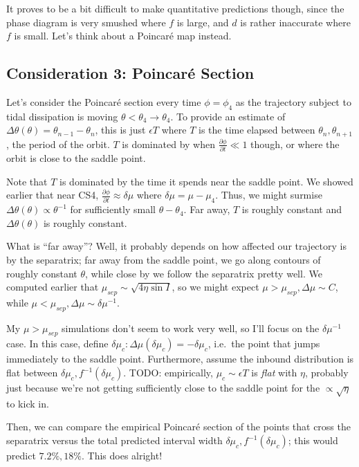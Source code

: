 \documentclass[11pt,
        usenames, %
        dvipsnames %
    ]{article}
\newcommand*{\pd}[2]{\frac{\partial#1}{\partial#2}}
\newcommand*{\p}[1]{\left(#1\right)}
\begin{document}
It proves to be a bit difficult to make quantitative predictions though, since
the phase diagram is very smushed where $f$ is large, and $d$ is rather
inaccurate where $f$ is small. Let's think about a Poincar\'e map instead.

\subsection{Consideration 3: Poincar\'e Section}

Let's consider the Poincar\'e section every time $\phi = \phi_4$ as the
trajectory subject to tidal dissipation is moving $\theta < \theta_4 \to
\theta_4$. To provide an estimate of $\Delta \theta(\theta) = \theta_{n - 1} -
\theta_n$, this is just $\epsilon T$ where $T$ is the time elapsed between
$\theta_n, \theta_{n + 1}$, the period of the orbit. $T$ is dominated by when
$\pd{\phi}{t} \ll 1$ though, or where the orbit is close to the saddle point.

Note that $T$ is dominated by the time it spends near the saddle point. We
showed earlier that near CS4, $\pd{\phi}{t} \approx \delta \mu$ where $\delta
\mu = \mu - \mu_4$. Thus, we might surmise $\Delta \theta(\theta) \propto
\theta^{-1}$ for sufficiently small $\theta - \theta_4$. Far away, $T$ is
roughly constant and $\Delta \theta(\theta)$ is roughly constant.

What is ``far away''? Well, it probably depends on how affected our trajectory
is by the separatrix; far away from the saddle point, we go along contours of
roughly constant $\theta$, while close by we follow the separatrix pretty well.
We computed earlier that $\mu_{sep} \sim \sqrt{4\eta \sin I}$, so we might
expect $\mu > \mu_{sep}, \Delta \mu \sim C$, while $\mu < \mu_{sep}, \Delta
\mu \sim \delta \mu^{-1}$.

My $\mu > \mu_{sep}$ simulations don't seem to work very well, so I'll focus on
the $\delta \mu^{-1}$ case. In this case, define $\delta \mu_c: \Delta
\mu\p{\delta \mu_c} = -\delta \mu_c$, i.e.\ the point that jumps immediately to
the saddle point. Furthermore, assume the inbound distribution is flat between
$\delta \mu_c, f^{-1}\p{\delta \mu_c}$. TODO\@: empirically, $\mu_c \sim
\epsilon T$ is \emph{flat} with $\eta$, probably just because we're not getting
sufficiently close to the saddle point for the $\propto \sqrt{\eta}$ to kick in.

Then, we can compare the empirical Poincar\'e section of the points that cross
the separatrix versus the total predicted interval width $\delta \mu_c,
f^{-1}\p{\delta \mu_c}$; this would predict $7.2\%, 18\%$. This does alright!
\end{document}
